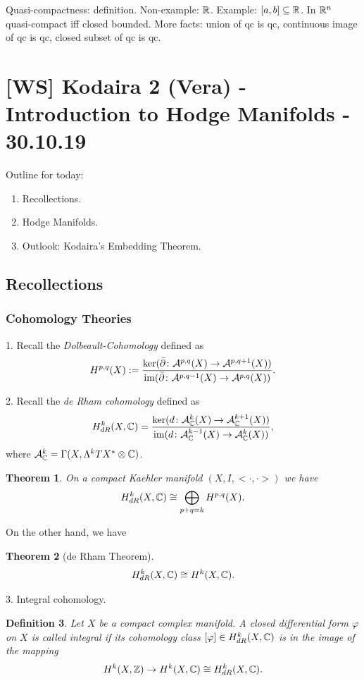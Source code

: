 \documentclass[A4paper, british]{amsart}
\theoremstyle{darkgreentheorem}
\newtheorem{thm}{Theorem}[section]
\theoremstyle{darkbluedefinition}
\newtheorem{defn}[thm]{Definition}
\theoremstyle{darkredexample}
\theoremstyle{remark}
\DeclareMathOperator{\im}{im}
\newcommand{\1}{\mathbbm{1}}
\newcommand{\ot}{\otimes}
\begin{document}
Quasi-compactness: definition.
Non-example: $\mathbb{R}$.
Example: $[a,b]\subseteq \mathbb{R}$.
In $\mathbb{R}^{n}$ quasi-compact iff closed bounded.
More facts: union of qc is qc, continuous image of qc is qc, closed subset of qc is qc.

\section{[WS] Kodaira 2 (Vera) - Introduction to Hodge Manifolds - 30.10.19}

Outline for today:
\begin{enumerate}[label=\arabic*)]
    \item Recollections.
    \item Hodge Manifolds.
    \item Outlook: Kodaira's Embedding Theorem.
\end{enumerate}

\subsection{Recollections}

\subsubsection{Cohomology Theories}

1. Recall the \textit{Dolbeault-Cohomology} defined as
\[ H^{p,q}(X):=\frac{\ker(\bar{\partial}\colon \calA^{p,q}(X)\to \calA^{p,q+1}(X))}{\im(\bar{\partial}\colon \calA^{p,q-1}(X)\to \calA^{p,q}(X))}.\]

2. Recall the \textit{de Rham cohomology} defined as
\[ H_{dR}^{k}(X,\C)=\frac{\ker(d\colon \calA_{\C}^{k}(X)\to \calA_{\C}^{k+1}(X))}{\im(d\colon \calA_{\C}^{k-1}(X)\to \calA_{\C}^{k}(X))}, \]
where $\calA_{\C}^{k}=\Gamma(X,\Lambda^{k}TX^{*}\ot \C)$.

\begin{thm}
    On a compact Kaehler manifold $(X,I,<\cdot,\cdot>)$ we have
    \[ H_{dR}^{k}(X,\mathbb{C})\cong \bigoplus_{p+q=k}H^{p,q}(X).\]
\end{thm}

On the other hand, we have

\begin{thm}[de Rham Theorem]
    \[ H_{dR}^{k}(X,\mathbb{C})\cong H^{k}(X,\mathbb{C}).\]
\end{thm}

3. Integral cohomology.

\begin{defn}
    Let $X$ be a compact complex manifold.
    A closed differential form $\varphi$ on $X$ is called \textit{integral} if its cohomology class $[\varphi]\in H^{k}_{dR}(X,\mathbb{C})$ is in the image of the mapping
    \[ H^{k}(X,\mathbb{Z})\to H^{k}(X,\mathbb{C})\cong H_{dR}^{k}(X,\mathbb{C}). \]
\end{defn}
\end{document}
